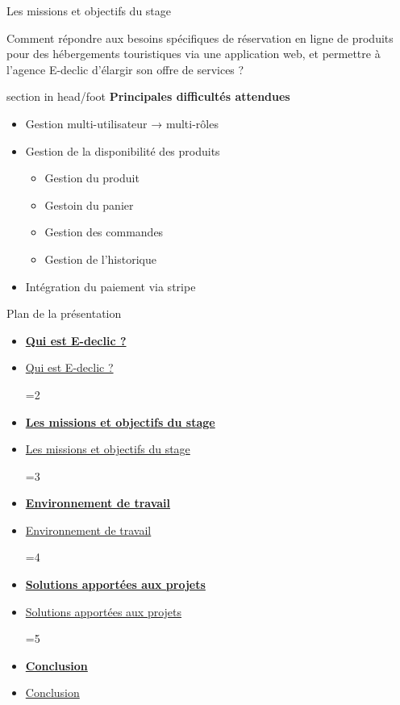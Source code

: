 \documentclass{beamer}
\newcommand{\planLine}[4]{
  \ifnum#1=#2
    \item \hyperlink{#3}{\textbf{\large #4}}
  \else
    \item \hyperlink{#3}{#4}
  \fi
}
\newcommand{\planSlide}[1]{
  	\begin{frame}{Plan de la présentation}
  		\begin{center}
  			\begin{minipage}{1\textwidth}
				\begin{itemize}
      			\planLine{#1}{1}{organisation}{Qui est E-declic ?}
      			\planLine{#1}{2}{sujet}{Les missions et objectifs du stage}
      			\planLine{#1}{3}{environnement}{Environnement de travail}
      			\planLine{#1}{4}{realisation}{Solutions apportées aux projets}
      			\planLine{#1}{5}{conclusion}{Conclusion}
	    		\end{itemize}
  		\end{minipage}
	\end{center}
	\vfill
	\end{frame}
}
\begin{document}
\begin{frame}{Les missions et objectifs du stage}

	Comment répondre aux besoins spécifiques de réservation en ligne de produits pour des hébergements touristiques via une application web, et permettre à l’agence E-declic d’élargir son offre de services ?
			
	\begin{center}
  		\begin{minipage}{0.9\textwidth}
			\begin{beamercolorbox}[wd=\paperwidth,ht=1.5em,dp=0.5em,leftskip=0.5cm]{section in head/foot}
  				\large \textbf{Principales difficultés attendues}
			\end{beamercolorbox}
			
			\begin{itemize}
				\item<1-> Gestion multi-utilisateur → multi-rôles
				\item<2-> Gestion de la disponibilité des produits
				\begin{itemize}
					\item Gestion du produit
					\item Gestoin du panier
					\item Gestion des commandes
					\item Gestion de l'historique
				\end{itemize}
				\item<3-> Intégration du paiement via stripe
			\end{itemize}
  			\vspace{1cm}
  		\end{minipage}
	\end{center}
	\vfill
\end{frame}

\planSlide{3}
\end{document}
